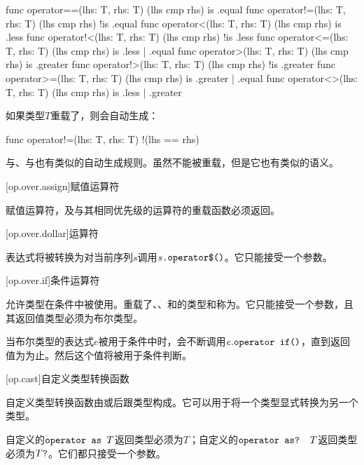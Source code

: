\begin{codeblock}
func operator==(lhs: T, rhs: T) { (lhs cmp rhs) is .equal }
func operator!=(lhs: T, rhs: T) { (lhs cmp rhs) !is .equal }
func operator<(lhs: T, rhs: T) { (lhs cmp rhs) is .less }
func operator!<(lhs: T, rhs: T) { (lhs cmp rhs) !is .less }
func operator<=(lhs: T, rhs: T) { (lhs cmp rhs) is .less | .equal }
func operator>(lhs: T, rhs: T) { (lhs cmp rhs) is .greater }
func operator!>(lhs: T, rhs: T) { (lhs cmp rhs) !is .greater }
func operator>=(lhs: T, rhs: T) { (lhs cmp rhs) is .greater | .equal }
func operator<>(lhs: T, rhs: T) { (lhs cmp rhs) is .less | .greater }
\end{codeblock}

\pnum
如果类型$T$重载了，则会自动生成：

\begin{codeblock}
func operator!=(lhs: T, rhs: T) { !(lhs == rhs) }
\end{codeblock}

与、与也有类似的自动生成规则。\enternote 虽然不能被重载，但是它也有类似的语义。\exitnote

[op.over.assign]{赋值运算符}

\pnum
赋值运算符，及与其相同优先级的运算符的重载函数必须返回。

[op.over.dollar]{\tcode{\$}运算符}

\pnum
\tcode{\$}表达式将被转换为对当前序列$s$调用$s\texttt{.operator\$()}$。它只能接受一个参数。

[op.over.if]{条件运算符}

\pnum
{}允许类型在条件中被使用。重载了、、和的类型和称为。它只能接受一个参数，且其返回值类型必须为布尔类型。

\pnum
当布尔类型的表达式$e$被用于条件中时，会不断调用$e.\texttt{operator if()}$，直到返回值为为止。然后这个值将被用于条件判断。

[op.cast]{自定义类型转换函数}

\pnum
自定义类型转换函数由或后跟类型构成。它可以用于将一个类型显式转换为另一个类型。

\pnum
自定义的$\texttt{operator as }T$返回类型必须为$T$；自定义的$\texttt{operator as? }T$返回类型必须为$T\texttt{?}$。它们都只接受一个参数。

